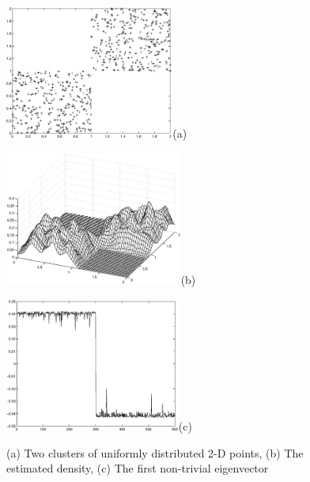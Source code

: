 \documentclass[12pt,letterpaper,doublespaced,ETD,dvips,proposal]{gtthesis}
\begin{document}
\begin{Body}
\begin{figure}[tb]
 \centerline{\includegraphics[height=4.4cm]{fig1a.eps}(a)}
 \centerline{\includegraphics[height=4.4cm]{fig1b.eps}(b)}
 \centerline{\includegraphics[height=4.4cm]{fig1c.eps}(c)}
 \caption{(a) Two clusters of uniformly distributed 2-D points,
(b) The estimated density, (c) The first non-trivial eigenvector }
  \label{fig1}
\end{figure}



\end{Body}
\end{document}
